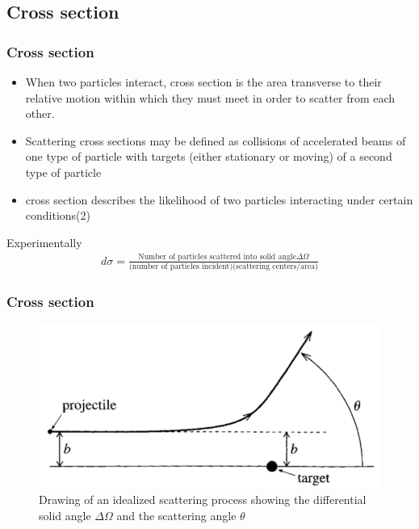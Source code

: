 \documentclass[11pt]{beamer}
\begin{document}
\begin{frame}
\section{Cross section}
\frametitle{Cross section}
\begin{itemize}
\item When two particles interact, cross section is the area transverse to their relative motion within
which they must meet in order to scatter from each other.
\item Scattering cross sections may be defined as collisions of accelerated beams of one type of
particle with targets (either stationary or moving) of a second type of particle
\item cross section describes the likelihood of two particles interacting under certain conditions(2)
\end{itemize}

Experimentally
\begin{align}
d\sigma=\frac{\text{Number of particles scattered into solid angle} \Delta\Omega}{\text{(number of particles incident)(scattering centers/area)}}
\end{align}
\end{frame}

\begin{frame}
\frametitle{Cross section}
\begin{center}
	\begin{figure}
		\includegraphics[scale=0.5]{figures/cs.png}
		\caption{Drawing of an idealized scattering process showing the differential solid angle $\Delta\Omega$ and the
			scattering angle $\theta$}
	\end{figure}
\end{center}
\end{frame}
\end{document}
